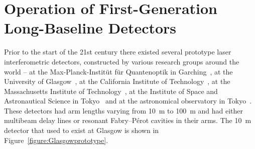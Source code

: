 \documentclass{article}
\begin{document}





\newpage

\section{Operation of First-Generation Long-Baseline Detectors}
\label{section:construction}

Prior to the start of the 21st century there existed several prototype
laser interferometric detectors, constructed by various research groups around
the world -- at the Max-Planck-Instit\"ut f\"ur Quantenoptik in
Garching~\cite{Shoemaker}, at the University of Glasgow~\cite{Robertson}, at the
California Institute of Technology~\cite{Abramovici}, at the Massachusetts
Institute of Technology~\cite{Fritschel2}, at the Institute of Space and
Astronautical Science in Tokyo~\cite{Mizuno} and at the astronomical observatory
in Tokyo~\cite{Araya}. These detectors had arm lengths varying from 10~m to
100~m and had either multibeam delay lines or resonant Fabry--P\'{e}rot cavities in
their arms. The 10~m detector that used to exist at Glasgow is shown in
Figure~\ref{figure:Glasgowprototype}.

\end{document}
